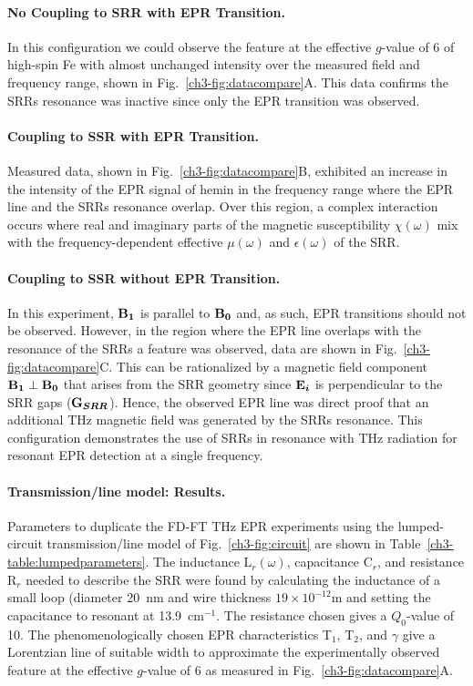 \noindent \paragraph*{No Coupling to SRR with EPR Transition.} In this configuration we could observe the feature at the effective $g$-value of 6 of high-spin Fe with almost unchanged intensity over the measured field and frequency range, shown in Fig.~\ref{ch3-fig:datacompare}A. This data confirms the SRRs resonance was inactive since only the EPR transition was observed. 

\noindent \paragraph*{Coupling to SSR with EPR Transition.} Measured data, shown in Fig.~\ref{ch3-fig:datacompare}B, exhibited an increase in the intensity of the EPR signal of hemin in the frequency range where the EPR line and the SRRs resonance overlap. Over this region, a complex interaction occurs where real and imaginary parts of the magnetic susceptibility $\chi(\omega)$ mix with the frequency-dependent effective $\mu(\omega)$ and $\epsilon(\omega)$ of the SRR.

\noindent \paragraph*{Coupling to SSR without EPR Transition.} In this experiment, $\textbf{B}\boldsymbol{_{1}}$ is parallel to $\textbf{B}\boldsymbol{_{0}}$ and, as such, EPR transitions should not be observed. However, in the region where the EPR line overlaps with the resonance of the SRRs a feature was observed, data are shown in Fig.~\ref{ch3-fig:datacompare}C. This can be rationalized by a magnetic field component $\textbf{B}\boldsymbol{_{1}}\perp\textbf{B}\boldsymbol{_{0}}$ that arises from the SRR geometry since $\textbf{E}\boldsymbol{_{i}}$ is perpendicular to the SRR gaps ($\textbf{G}\boldsymbol{_{SRR}}$). Hence, the observed EPR line was direct proof that an additional THz magnetic field was generated by the SRRs resonance. This configuration demonstrates the use of SRRs in resonance with THz radiation for resonant EPR detection at a single frequency. 

\noindent \paragraph*{Transmission\-/line model: Results.} Parameters to duplicate the FD-FT THz EPR experiments using the lumped-circuit transmission\-/line model of Fig.~\ref{ch3-fig:circuit} are shown in Table~\ref{ch3-table:lumpedparameters}. The inductance L$_r(\omega)$, capacitance C$_r$, and resistance R$_r$ needed to describe the SRR were found by calculating the inductance of a small loop (diameter 20~nm and wire thickness $19 \times 10^{-12}$m and setting the capacitance to resonant at 13.9~cm$^{-1}$. The resistance chosen gives a $Q_0$-value of 10. The phenomenologically chosen EPR characteristics T$_1$, T$_2$, and $\gamma$ give a Lorentzian line of suitable width to approximate the experimentally observed feature at the effective $g$-value of 6 as measured in Fig.~\ref{ch3-fig:datacompare}A. 


